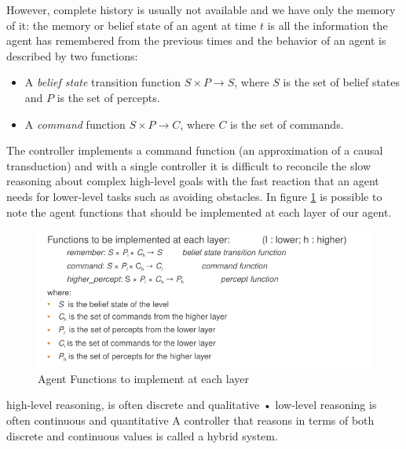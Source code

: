 However, complete history is usually not available and we have only the memory of it:
the memory or belief state of an agent at time $t$ is all the information the agent
has remembered from the previous times and the behavior of an agent is described by two functions:
\begin{itemize}
    \item A \emph{belief state} transition function $S \times P \to S$, where $S$ is the set of belief states 
          and $P$ is the set of percepts.
    \item A \emph{command} function $S \times P \to C$, where $C$ is the set of commands.
\end{itemize}
The controller implements a command function (an approximation of a causal transduction) and 
with a single controller it is difficult to reconcile the slow reasoning about complex high-level goals
with the fast reaction that an agent needs for lower-level tasks such as avoiding obstacles.\newline
In figure \ref{img:agentFunctions} is possible to note the agent functions that should be implemented 
at each layer of our agent.

\begin{figure}
    \caption{Agent Functions to implement at each layer}
    \label{img:agentFunctions}
    \includegraphics[width=\textwidth]{Images/agentFunctions}
\end{figure}
high-level reasoning, is often discrete and qualitative
• low-level reasoning is often continuous and quantitative
A controller that reasons in terms of both discrete and continuous values
is called a hybrid system.

